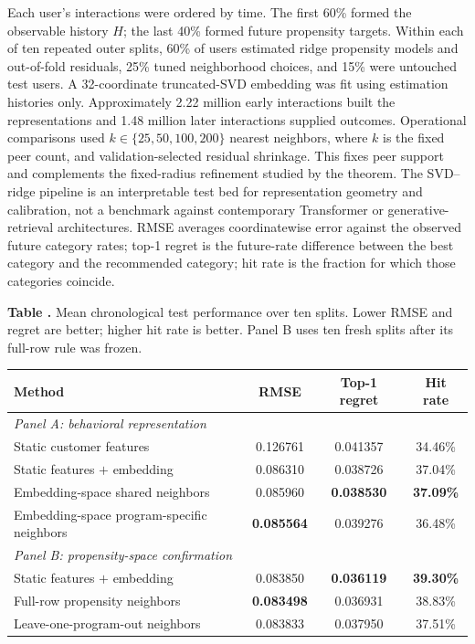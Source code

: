 \documentclass[11pt]{article}
\theoremstyle{noteplain}
\theoremstyle{definition}
\begin{document}
Each user's interactions were ordered by time. The first 60\% formed the observable history $H$; the last 40\% formed future propensity targets. Within each of ten repeated outer splits, 60\% of users estimated ridge propensity models and out-of-fold residuals, 25\% tuned neighborhood choices, and 15\% were untouched test users. A 32-coordinate truncated-SVD embedding was fit using estimation histories only. Approximately 2.22 million early interactions built the representations and 1.48 million later interactions supplied outcomes. Operational comparisons used $k\in\{25,50,100,200\}$ nearest neighbors, where $k$ is the fixed peer count, and validation-selected residual shrinkage. This fixes peer support and complements the fixed-radius refinement studied by the theorem. The SVD--ridge pipeline is an interpretable test bed for representation geometry and calibration, not a benchmark against contemporary Transformer or generative-retrieval architectures. RMSE averages coordinatewise error against the observed future category rates; top-1 regret is the future-rate difference between the best category and the recommended category; hit rate is the fraction for which those categories coincide.

\begin{center}
\parbox{.92\linewidth}{\small\textbf{Table \thetable.} Mean chronological test performance over ten splits. Lower RMSE and regret are better; higher hit rate is better. Panel B uses ten fresh splits after its full-row rule was frozen.}
\label{tab:results}
\vspace{.35em}
\small
\begin{tabular}{lccc}
\toprule
Method & RMSE & Top-1 regret & Hit rate \\
\midrule
\multicolumn{4}{l}{\emph{Panel A: behavioral representation}}\\
Static customer features & 0.126761 & 0.041357 & 34.46\%\\
Static features $+$ embedding & 0.086310 & 0.038726 & 37.04\%\\
Embedding-space shared neighbors & 0.085960 & \textbf{0.038530} & \textbf{37.09\%}\\
Embedding-space program-specific neighbors & \textbf{0.085564} & 0.039276 & 36.48\%\\
\midrule
\multicolumn{4}{l}{\emph{Panel B: propensity-space confirmation}}\\
Static features $+$ embedding & 0.083850 & \textbf{0.036119} & \textbf{39.30\%}\\
Full-row propensity neighbors & \textbf{0.083498} & 0.036931 & 38.83\%\\
Leave-one-program-out neighbors & 0.083833 & 0.037950 & 37.51\%\\
\bottomrule
\end{tabular}
\end{center}
\end{document}
